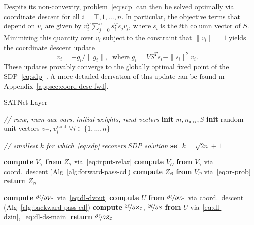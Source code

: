 \documentclass{article}
\newcommand{\norm}[1] {\|#1\|}
\newcommand{\truthvar}{\top}
\newcommand{\inset}{\mathcal{I}}
\newcommand{\outset}{\mathcal{O}}
\begin{document}
	Despite its non-convexity, problem~\eqref{eq:sdp} can then be solved optimally via coordinate descent for all $i=\truthvar, 1, \ldots, n$.
	In particular, the objective terms that depend on $v_i$ are given by $v_i^T \sum_{j=0}^n s_i^T s_j v_j$, where $s_i$ is the $i$th column vector of $S$.
	Minimizing this quantity over $v_i$ subject to the constraint that $\|v_i\| = 1$ yields the coordinate descent update
	\begin{equation}
		\label{eq:coord-desc-forward}
		v_i = -g_i/\norm{g_i},\;\;\text{where}\;g_i = VS^T s_i - \norm{s_i}^2 v_i.
	\end{equation}
	These updates provably converge to the globally optimal fixed point of the SDP~\eqref{eq:sdp} \cite{wang2017mixing}.
	A more detailed derivation of this update can be found in Appendix~\ref{appsec:coord-desc-fwd}.


	\begin{algorithm}[t!]
		\caption{SATNet Layer}
		\begin{algorithmic}[1]
			\State \emph{// rank, num aux vars, initial weights, rand vectors}
			\State \textbf{init} $m, n_{\text{aux}}, S$ \State \textbf{init} random unit vectors $v_{\truthvar}$, $v_{i}^{\text{rand}} \; \forall i \in \{1, \ldots, n\}$
			
			\State \emph{// smallest $k$ for which~\eqref{eq:sdp} recovers SDP solution}
			\State \textbf{set} $k = \sqrt{2n}+1$ \hspace{1em}
			
			\EndProcedure
			\State
			
			\Procedure{forward}{$Z_{\inset}$} \hspace{3.5em}
			\State \textbf{compute} $V_{\inset}$ \textbf{from} $Z_{\inset}$ via~\eqref{eq:input-relax}
			\State \textbf{compute} $V_{\outset}$ \textbf{from} $V_{\inset}$ via coord.\ descent (Alg~\ref{alg:forward-pass-cd})
			\State \textbf{compute} $Z_{\outset}$ \textbf{from} $V_{\outset}$ via~\eqref{eq:rr-prob}
			\State \textbf{return} $Z_{\outset}$
			\EndProcedure
			\State
			
			\Procedure{backward}{$\nicefrac{\partial \ell}{\partial Z_{\outset}}$}
			\State \textbf{compute} $\nicefrac{\partial \ell}{\partial V_{\outset}}$ via~\eqref{eq:dl-dvout}
			\State \textbf{compute} $U$ \textbf{from} $\nicefrac{\partial \ell}{\partial V_{\outset}}$  via coord.\ descent (Alg~\ref{alg:backward-pass-cd})
			\State \textbf{compute} $\nicefrac{\partial \ell}{\partial Z_{\inset}}$, $\nicefrac{\partial \ell}{\partial S}$ \textbf{from} $U$ via~\eqref{eq:dl-dzin},~\eqref{eq:dl-ds-main}
			\State \textbf{return} $\nicefrac{\partial \ell}{\partial Z_{\inset}}$
			\EndProcedure
		\end{algorithmic}
		\label{alg:satnet}
	\end{algorithm}
	
\end{document}
